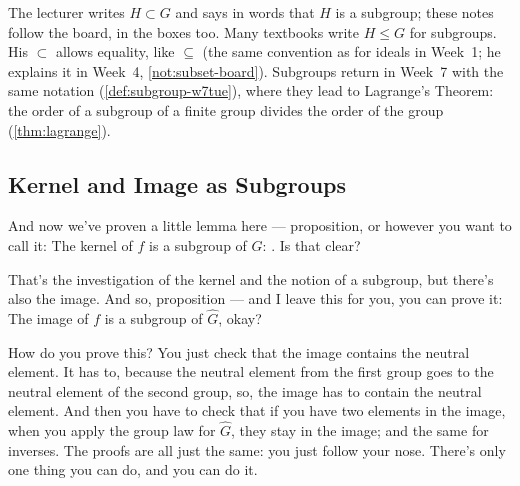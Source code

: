 \begin{aiNote}
The lecturer writes $H \subset G$ and says in words that $H$ is a subgroup; these notes follow the board, in the boxes too. Many textbooks write $H \le G$ for subgroups. His $\subset$ allows equality, like $\subseteq$ (the same convention as for ideals in Week~1; he explains it in Week~4, \cref{not:subset-board}). Subgroups return in Week~7 with the same notation (\cref{def:subgroup-w7tue}), where they lead to Lagrange's Theorem: the order of a subgroup of a finite group divides the order of the group (\cref{thm:lagrange}).
\end{aiNote}

\subsection{Kernel and Image as Subgroups}

\begin{speech}[00:26:29 - 00:28:05]
And now we've proven a little lemma here --- proposition, or however you want to call it: The kernel of $f$ is a subgroup of $G$: . Is that clear?

That's the investigation of the kernel and the notion of a subgroup, but there's also the image. And so, proposition --- and I leave this for you, you can prove it: The image of $f$ is a subgroup of $\hat{G}$,  okay?

How do you prove this? You just check that the image contains the neutral element. It has to, because the neutral element from the first group goes to the neutral element of the second group, so, the image has to contain the neutral element. And then you have to check that if you have two elements in the image, when you apply the group law for $\hat{G}$, they stay in the image; and the same for inverses. The proofs are all just the same: you just follow your nose. There's only one thing you can do, and you can do it.
\end{speech}

